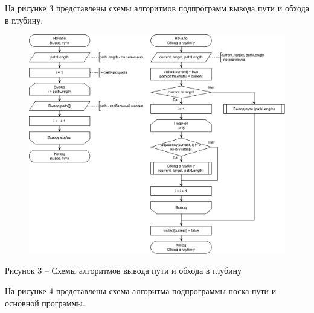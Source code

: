 \documentclass[a4paper,14pt]{extarticle}
\begin{document}
  \pagebreak
  На рисунке 3 представлены схемы алгоритмов подпрограмм вывода пути и обхода в глубину.

  \begin{figure}[h]
    \centering
    \includegraphics[width=1\linewidth]{images/s-2.png}
  \end{figure}
  \begin{center}
    Рисунок 3 – Схемы алгоритмов вывода пути и обхода в глубину
  \end{center}

  \pagebreak
  На рисунке 4 представлены схема алгоритма подпрограммы поска пути и основной программы.
\end{document}
